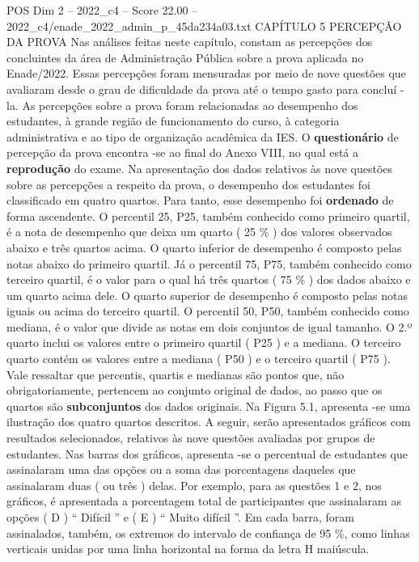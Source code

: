 \begin{textsample}{POS Dim 2 – 2022\_c4 – Score 22.00 – 2022\_c4/enade\_2022\_admin\_p\_45da234a03.txt}  \label{ex:f2_pos_029}
CAPÍTULO 5 PERCEPÇÃO DA PROVA Nas análises feitas neste capítulo, constam as percepções dos concluintes da área de Administração Pública sobre a prova aplicada no Enade/2022.
Essas percepções foram mensuradas por meio de nove questões que avaliaram desde o grau de dificuldade da prova até o tempo gasto para concluí -la.
As percepções sobre a prova foram relacionadas ao desempenho dos estudantes, à grande região de funcionamento do curso, à categoria administrativa e ao tipo de organização acadêmica da IES.
O \textbf{questionário} de percepção da prova encontra -se ao final do Anexo VIII, no qual está a \textbf{reprodução} do exame.
Na apresentação dos dados relativos às nove questões sobre as percepções a respeito da prova, o desempenho dos estudantes foi classificado em quatro quartos.
Para tanto, esse desempenho foi \textbf{ordenado} de forma ascendente.
O percentil 25, P25, também conhecido como primeiro quartil, é a nota de desempenho que deixa um quarto ( 25 \% ) dos valores observados abaixo e três quartos acima.
O quarto inferior de desempenho é composto pelas notas abaixo do primeiro quartil.
Já o percentil 75, P75, também conhecido como terceiro quartil, é o valor para o qual há três quartos ( 75 \% ) dos dados abaixo e um quarto acima dele.
O quarto superior de desempenho é composto pelas notas iguais ou acima do terceiro quartil.
O percentil 50, P50, também conhecido como mediana, é o valor que divide as notas em dois conjuntos de igual tamanho.
O 2.º quarto inclui os valores entre o primeiro quartil ( P25 ) e a mediana.
O terceiro quarto contém os valores entre a mediana ( P50 ) e o terceiro quartil ( P75 ).
Vale ressaltar que percentis, quartis e medianas são pontos que, não obrigatoriamente, pertencem ao conjunto original de dados, ao passo que os quartos são \textbf{subconjuntos} dos dados originais.
Na Figura 5.1, apresenta -se uma ilustração dos quatro quartos descritos.
A seguir, serão apresentados gráficos com resultados selecionados, relativos às nove questões avaliadas por grupos de estudantes.
Nas barras dos gráficos, apresenta -se o percentual de estudantes que assinalaram uma das opções ou a soma das porcentagens daqueles que assinalaram duas ( ou três ) delas.
Por exemplo, para as questões 1 e 2, nos gráficos, é apresentada a porcentagem total de participantes que assinalaram as opções ( D ) “ Difícil ” e ( E ) “ Muito difícil ”.
Em cada barra, foram assinalados, também, os extremos do intervalo de confiança de 95 \%, como linhas verticais unidas por uma linha horizontal na forma da letra H maiúscula.

\end{textsample}
